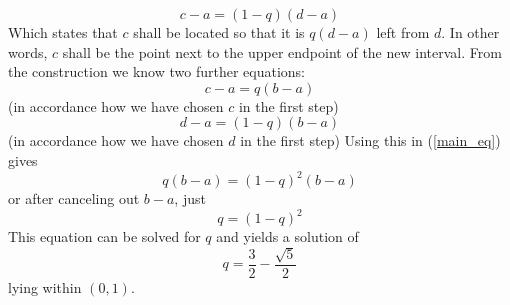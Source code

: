 \documentclass[17pt]{extarticle}
\begin{document}
\begin{equation} \label{main_eq}
c-a = (1-q)(d-a)
\end{equation}
Which states that $c$ shall be located so that it is $q(d-a)$
left from $d$. In other words, $c$ shall be the point
next to the upper endpoint of the new interval.
From the construction we know two further equations:
\begin{equation*}
	c-a=q(b-a)
\end{equation*}
(in accordance how we have chosen $c$ in the first step)
\begin{equation*}
	d-a=(1-q)(b-a)
\end{equation*}
(in accordance how we have chosen $d$ in the first step)
Using this in (\ref{main_eq}) gives
$$
q(b-a)=(1-q)^2(b-a)
$$
or after canceling out $b-a$, just
$$
q=(1-q)^2
$$
This equation can be solved for $q$ and yields a solution
of
$$
q=\frac{3}{2}-\frac{\sqrt{5}}{2}
$$
lying within $(0,1)$.
\end{document}
